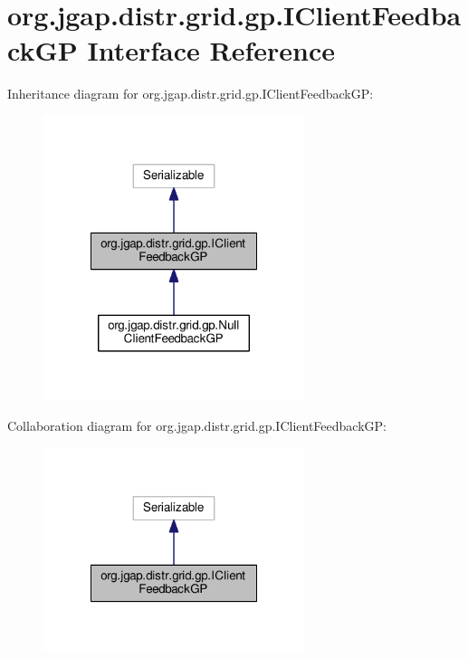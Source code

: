 \hypertarget{interfaceorg_1_1jgap_1_1distr_1_1grid_1_1gp_1_1_i_client_feedback_g_p}{\section{org.\-jgap.\-distr.\-grid.\-gp.\-I\-Client\-Feedback\-G\-P Interface Reference}
\label{interfaceorg_1_1jgap_1_1distr_1_1grid_1_1gp_1_1_i_client_feedback_g_p}
}


Inheritance diagram for org.\-jgap.\-distr.\-grid.\-gp.\-I\-Client\-Feedback\-G\-P\-:
\nopagebreak
\begin{figure}[H]
\begin{center}
\leavevmode
\includegraphics[width=216pt]{interfaceorg_1_1jgap_1_1distr_1_1grid_1_1gp_1_1_i_client_feedback_g_p__inherit__graph}
\end{center}
\end{figure}


Collaboration diagram for org.\-jgap.\-distr.\-grid.\-gp.\-I\-Client\-Feedback\-G\-P\-:
\nopagebreak
\begin{figure}[H]
\begin{center}
\leavevmode
\includegraphics[width=216pt]{interfaceorg_1_1jgap_1_1distr_1_1grid_1_1gp_1_1_i_client_feedback_g_p__coll__graph}
\end{center}
\end{figure}
